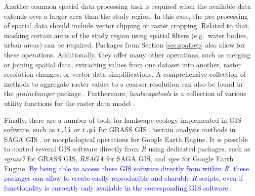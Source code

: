 \documentclass[smallextended]{svjour3}       %
\begin{document}
Another common spatial data processing task is required when the available data extends over a larger area than the study region.
In this case, the pre-processing of spatial data should include vector clipping or raster cropping.
Related to that, masking certain areas of the study region using spatial filters (e.g.~water bodies, urban areas) can be required.
Packages from Section \ref{sec:spatrep} also allow for these operations.
Additionally, they offer many other operations, such as merging or joining spatial data, extracting values from one dataset into another, raster resolution changes, or vector data simplifications.
A comprehensive collection of methods to aggregate raster values to a coarser resolution can also be found in the \textit{grainchanger} package \cite{Graham2019}.
Furthermore, \textit{landscapetools} is a collection of various utility functions for the raster data model \cite{Sciaini2018}.

Finally, there are a number of tools for landscape ecology implemented in GIS software, such as \texttt{r.li} or \texttt{r.pi} for GRASS GIS \cite{Wegmann2018,Neteler2012,Porta2017}, terrain analysis methods in SAGA GIS \cite{Conrad2015}, or morphological operations for Google Earth Engine.
It is possible to control several GIS software directly from \textit{R} using dedicated packages, such as \textit{rgrass7} \cite{Bivand2021} for GRASS GIS, \textit{RSAGA} \cite{Brenning2018} for SAGA GIS, and \textit{rgee} \cite{Aybar2020} for Google Earth Engine.
\textcolor{blue}{By being able to access these GIS software directly from within \textit{R}, these packages can allow to create easily reproducible and sharable \textit{R} scripts, even if functionality is currently only available in the corresponding GIS software.}
\end{document}
